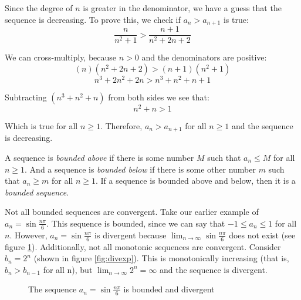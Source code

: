 Since the degree of $n$ is greater in the denominator, we have a guess that 
the sequence is decreasing. To prove this, we check if $a_n > a_{n+1}$ is true:
$$\frac{n}{n^2 + 1} > \frac{n + 1}{n^2 + 2n + 2}$$

We can cross-multiply, because $n > 0$ and the denominators are positive:
$$(n)(n^2 + 2n + 2) > (n+1)(n^2 + 1)$$
$$n^3 + 2n^2 + 2n > n^3 + n^2 + n + 1$$

Subtracting $(n^3 + n^2 + n)$ from both sides we see that:
$$n^2 + n > 1$$

Which is true for all $n \geq1$. Therefore, $a_n > a_{n+1}$ for all $n \geq 1$ 
and the sequence is decreasing. 

A sequence is \textit{bounded above} if there is some number $M$ such that 
$a_n \leq M$ for all $n \geq 1$. And a sequence is \textit{bounded below} if 
there is some other number $m$ such that $a_n \geq m$ for all $n \geq 1$. If a 
sequence is bounded above and below, then it is a \textit{bounded sequence}. 

Not all bounded sequences are convergent. Take our earlier example of $a_n = 
\sin{\frac{n\pi}{6}}$. This sequence is bounded, since we can say that $- 1 
\leq a_n \leq 1$ for all $n$. However, $a_n = \sin{\frac{n\pi}{6}}$ is 
divergent because $\lim_{n \to \infty} \sin{\frac{n\pi}{6}}$ does not exist 
(see figure \ref{fig:divsine}). Additionally, not all monotonic sequences are 
convergent. Consider $b_n = 2^n$ (shown in figure \ref{fig:divexp}). This is 
monotonically increasing (that is, $b_n > b_{n-1}$ for all n), but $\lim_{n \to 
\infty} 2^n = \infty$ and the sequence is divergent. 

\begin{figure}
    \centering
    \caption{The sequence $a_n = \sin{\frac{n\pi}{6}}$ is bounded and divergent}
    \label{fig:divsine}
\end{figure}

